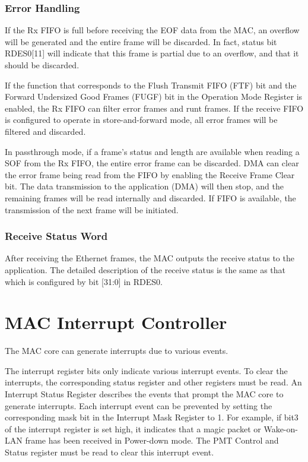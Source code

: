\documentclass[main\_\_EN.tex]{subfiles}
\begin{document}
\subsubsection{Error Handling}
If the Rx FIFO is full before receiving the EOF data from the MAC, an overflow will be generated and the entire frame will be discarded. In fact, status bit RDES0[11]  will indicate that this frame is partial due to an overflow, and that it should be discarded.

If the function that corresponds to the Flush Transmit FIFO (FTF) bit and the Forward Undersized Good Frames (FUGF) bit in the Operation Mode Register is enabled, the Rx FIFO can filter error frames and runt frames. If the receive FIFO is configured to operate in store-and-forward mode, all error frames will be filtered and discarded.

In passthrough mode, if a frame's status and length are available when reading a SOF from the Rx FIFO, the entire error frame can be discarded. DMA can clear the error frame being read from the FIFO by enabling the Receive Frame Clear bit. The data transmission to the application (DMA) will then stop, and the remaining frames will be read internally and discarded. If FIFO is available, the transmission of the next frame will be initiated.
\subsubsection{Receive Status Word}
After receiving the Ethernet frames, the MAC outputs the receive status to the application. The detailed description of the receive status is the same as that which is configured by bit [31:0] in RDES0.

\section{MAC Interrupt Controller}
The MAC core can generate interrupts due to various events.

The interrupt register bits only indicate various interrupt events. To clear the interrupts, the corresponding status register and other registers must be read. An Interrupt Status Register describes the events that prompt the MAC core to generate interrupts. Each interrupt event can be prevented by setting the corresponding mask bit in the Interrupt Mask Register to 1.
For example, if bit3 of the interrupt register is set high, it indicates that a magic packet or Wake-on-LAN frame has been received in Power-down mode. The PMT Control and Status register must be read to clear this interrupt event.
\end{document}
